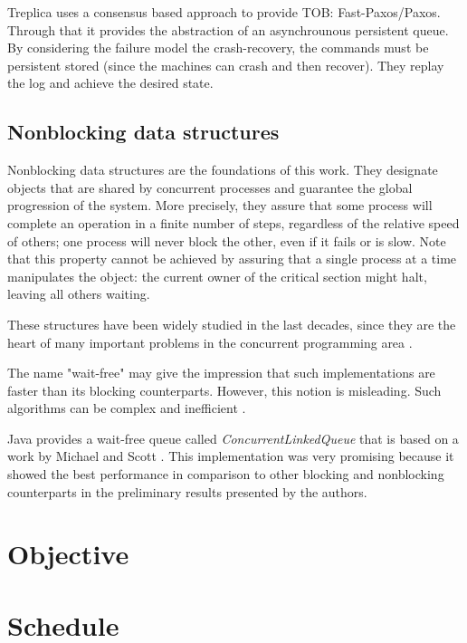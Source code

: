\documentclass[12pt]{article}
\begin{document}
Treplica uses a consensus based approach to provide TOB: Fast-Paxos/Paxos. Through that it provides the abstraction of an asynchrounous persistent queue.
By considering the failure model the crash-recovery, the commands must be persistent stored (since the machines can crash and then recover). They replay the log and achieve the desired state.


\subsection{Nonblocking data structures}
Nonblocking data structures are the foundations of this work. They designate
objects that are shared by concurrent processes and guarantee the global
progression of the system. More precisely, they  assure that some process will
complete an operation in a finite number of steps, regardless of the relative
speed of others; one process will never block the other, even if it fails or is
slow. Note that this  property cannot be achieved by assuring that a single
process at a time manipulates the object: the current owner of the critical
section might halt, leaving all others waiting.

These structures have been widely studied in the last decades, since they are
the heart of many important problems in the concurrent programming area
\cite{herlihy2011art}.

The name "wait-free" may give the impression that such implementations are
faster than its blocking counterparts. However, this notion is misleading.  Such
algorithms can be complex and inefficient \cite{attiya1994wait}.

Java provides a wait-free queue called \textit{ConcurrentLinkedQueue} that is
based on a work by Michael and Scott \cite{michael1996simple}. This
implementation was very promising because it showed the best performance in
comparison to other blocking and nonblocking counterparts in the preliminary
results presented by the authors.


\section{Objective}
\label{sec:contrib}



\section{Schedule}
\label{sec:schedule}


\vskip 15mm

{}

\end{document}
